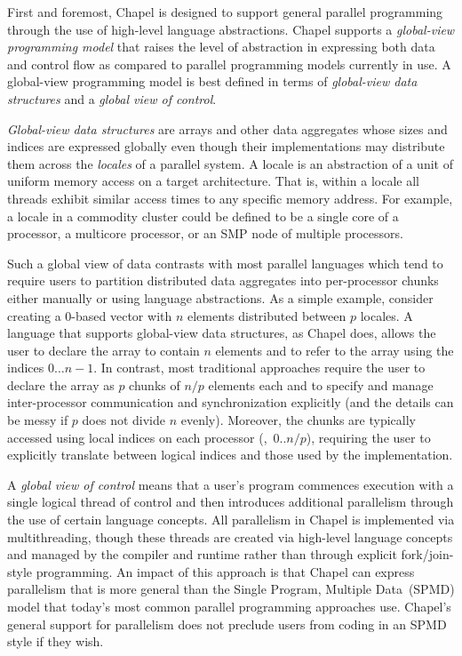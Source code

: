 First and foremost, Chapel is designed to support general parallel
programming through the use of high-level language abstractions.
Chapel supports a \emph{global-view programming model} that raises the
level of abstraction in expressing both data and control flow as
compared to parallel programming models currently in use.
A global-view programming model is best defined in terms
of \emph{global-view data structures} and a \emph{global view of
control}.

\emph{Global-view data structures} are arrays and other data
aggregates whose sizes and indices are expressed globally even though
their implementations may distribute them across the \emph{locales} of
a parallel system.  A locale is an abstraction of a unit of uniform
memory access on a target architecture.  That is, within a locale all
threads exhibit similar access times to any specific memory address.
For example, a locale in a commodity cluster could be defined to be a
single core of a processor, a multicore processor, or an SMP node of
multiple processors.

Such a global view of data contrasts with most parallel languages
which tend to require users to partition distributed data aggregates
into per-processor chunks either manually or using language
abstractions.  As a simple example, consider creating a 0-based vector
with $n$ elements distributed between $p$ locales.  A language
that supports global-view data structures, as Chapel does, allows the user to
declare the array to contain $n$ elements and to refer to the array
using the indices $0 \ldots n-1$.  In contrast, most traditional
approaches require the user to declare the array as $p$ chunks of
$n/p$ elements each and to specify and manage inter-processor
communication and synchronization explicitly (and the details can be
messy if $p$ does not divide $n$ evenly).  Moreover, the chunks are
typically accessed using local indices on each processor
(\eg,~$0..n/p$), requiring the user to explicitly translate between
logical indices and those used by the implementation.

A \emph{global view of control} means that a user's program commences
execution with a single logical thread of control and then introduces
additional parallelism through the use of certain language concepts.
All parallelism in Chapel is implemented via multithreading, though
these threads are created via high-level language concepts and managed
by the compiler and runtime rather than through explicit
fork/join-style programming.  An impact of this approach is that
Chapel can express parallelism that is more general than the Single
Program, Multiple Data~(SPMD) model that today's most common parallel
programming approaches use.  Chapel's general support for parallelism does not
preclude users from coding in an SPMD style if they wish.

